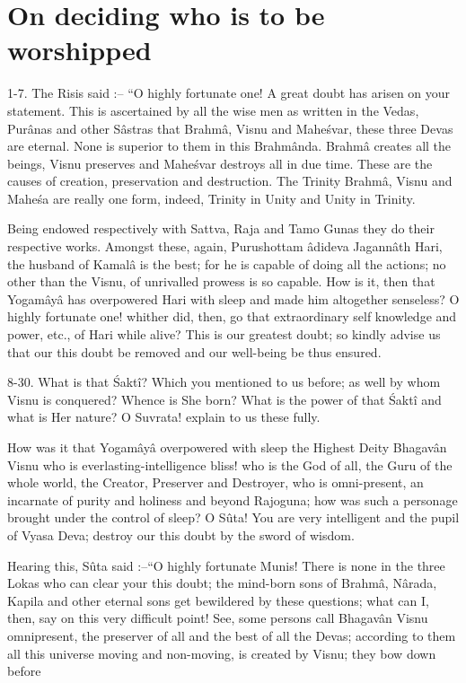 \chapter{On deciding who is to be worshipped}

1-7. The Risis said :-- ``O highly fortunate one! A great doubt has arisen on your statement. This is ascertained by all the wise men as written in the Vedas, Pur\^anas and other S\^astras that Brahm\^a, Visnu and Mahe\'svar, these three Devas are eternal. None is superior to them in this Brahm\^anda. Brahm\^a creates all the beings, Visnu preserves and Mahe\'svar destroys all in due time. These are the causes of creation, preservation and destruction. The Trinity Brahm\^a, Visnu and Mahe\'sa are really one form, indeed, Trinity in Unity and Unity in Trinity.

Being endowed respectively with Sattva, Raja and Tamo Gunas they do their respective works. Amongst these, again, Purushottam \^adideva Jagann\^ath Hari, the husband of Kamal\^a is the best; for he is capable of doing all the actions; no other than the Visnu, of unrivalled prowess is so capable. How is it, then that Yogam\^ay\^a has overpowered Hari with sleep and made him altogether senseless? O highly fortunate one! whither did, then, go that extraordinary self knowledge and power, etc., of Hari while alive? This is our greatest doubt; so kindly advise us that our this doubt be removed and our well-being be thus ensured.

8-30. What is that \'Sakt\^i? Which you mentioned to us before; as well by whom Visnu is conquered? Whence is She born? What is the power of that \'Sakt\^i and what is Her nature? O Suvrata! explain to us these fully.

How was it that Yogam\^ay\^a overpowered with sleep the Highest Deity Bhagav\^an Visnu who is everlasting-intelligence bliss! who is the God of all, the Guru of the whole world, the Creator, Preserver and Destroyer, who is omni-present, an incarnate of purity and holiness and beyond Rajoguna; how was such a personage brought under the control of sleep? O S\^uta! You are very intelligent and the pupil of Vyasa Deva; destroy our this doubt by the sword of wisdom.

Hearing this, S\^uta said :--``O highly fortunate Munis! There is none in the three Lokas who can clear your this doubt; the mind-born sons of Brahm\^a, N\^arada, Kapila and other eternal sons get bewildered by these questions; what can I, then, say on this very difficult point! See, some persons call Bhagav\^an Visnu omnipresent, the preserver of all and the best of all the Devas; according to them all this universe moving and non-moving, is created by Visnu; they bow down before

